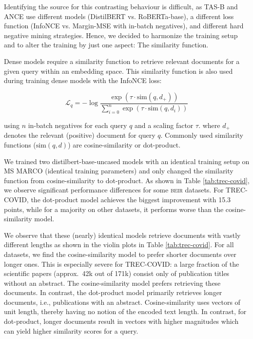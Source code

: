 \documentclass{article}
\newcommand{\custo}[1]{\textsc{\normalsize #1}}
\newcommand{\beir}{\custo{beir}\xspace}
\begin{document}
Identifying the source for this contrasting behaviour is difficult, as TAS-B and ANCE use different models (DistilBERT vs. RoBERTa-base), a different loss function (InfoNCE \cite{oord2019representation} vs. Margin-MSE \cite{hofstatter2021improving} with in-batch negatives), and different hard negative mining strategies. Hence, we decided to harmonize the training setup and to alter the training by just one aspect: The similarity function.

Dense models require a similarity function to retrieve relevant documents for a given query within an embedding space. This similarity function is also used during training dense models with the InfoNCE \cite{oord2019representation} loss:

$$\mathcal{L}_q = -\log \frac{\exp(\tau \cdot \text{sim}(q, d_+))}{\sum_{i=0}^n \exp(\tau \cdot \text{sim}(q, d_i))}$$

using $n$ in-batch negatives for each query $q$ and a scaling factor $\tau$. where $d_+$ denotes the relevant (positive) document for query $q$. Commonly used similarity functions ($\text{sim}(q, d)$) are cosine-similarity or dot-product. 

We trained two distilbert-base-uncased models with an identical training setup on MS MARCO (identical training parameters) and only changed the similarity function from cosine-similarity to dot-product. As shown in Table \ref{tab:trec-covid}, we observe significant performance differences for some \beir datasets. For TREC-COVID, the dot-product model achieves the biggest improvement with 15.3 points, while for a majority on other datasets, it performs worse than the cosine-similarity model.

We observe that these (nearly) identical models retrieve documents with vastly different lengths as shown in the violin plots in Table \ref{tab:trec-covid}. For all datasets, we find the cosine-similarity model to prefer shorter documents over longer ones. This is especially severe for TREC-COVID: a large fraction of the scientific papers (approx.~42k out of 171k) consist only of publication titles without an abstract. The cosine-similarity model prefers retrieving these documents. In contrast, the dot-product model primarily retrieves longer documents, i.e., publications with an abstract. Cosine-similarity uses vectors of unit length, thereby having no notion of the encoded text length. In contrast, for dot-product, longer documents result in vectors with higher magnitudes which can yield higher similarity scores for a query.
\end{document}
